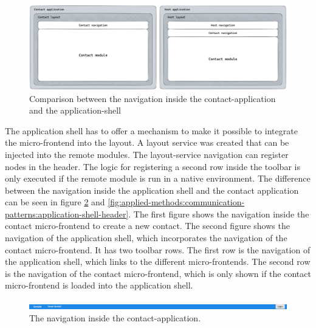 \ifshowImages
  \begin{figure}[H]
  \centering
  \includegraphics[width=1\linewidth]{images/applied-methods/communication-patterns/layout-comparison.png}
  \caption{Comparison between the navigation inside the contact-application and the application-shell}\label{fig:applied-methods:communication-patterns:comparison-between-host-and-contact-layout}
  \end{figure}
\fi

\noindent The application shell has to offer a mechanism to make it possible to integrate the micro-frontend into the layout. A layout service was created that can be injected into the remote modules. The layout-service navigation can register nodes in the header. The logic for registering a second row inside the toolbar is only executed if the remote module is run in a native environment. The difference between the navigation inside the application shell and the contact application can be seen in figure \ref{fig:applied-methods:communication-patterns:contact-application-header} and \ref{fig:applied-methods:communication-patterns:application-shell-header}. The first figure shows the navigation inside the contact micro-frontend to create a new contact. The second figure shows the navigation of the application shell, which incorporates the navigation of the contact micro-frontend. It has two toolbar rows. The first row is the navigation of the application shell, which links to the different micro-frontends. The second row is the navigation of the contact micro-frontend, which is only shown if the contact micro-frontend is loaded into the application shell.

\ifshowImages
  \begin{figure}[H]
  \centering
  \includegraphics[width=1\linewidth]{images/applied-methods/communication-patterns/contact-header.png}
  \caption{The navigation inside the contact-application.}\label{fig:applied-methods:communication-patterns:contact-application-header}
  \end{figure}
\fi

